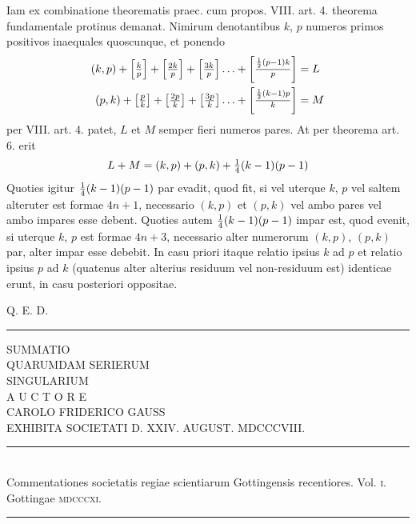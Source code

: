 \documentclass[twoside,12pt]{memoir}
\let\oldfrac\frac
\def\frac#1#2{\mathchoice{\tfrac{#1}{#2}}{\oldfrac{#1}{#2}}{\genfrac{}{}{}{2}{#1}{#2\mathstrut}}{\genfrac{}{}{}{3}{#1}{#2\mathstrut}}}
\begin{document}
Iam ex combinatione theorematis praec. cum propos. VIII. art. 4. theorema fundamentale protinus demanat. Nimirum denotantibus \(k\), \(p\) numeros primos positivos inaequales quoscunque, et ponendo
\[\begin{aligned}
(k, p)+\left[\frac{k}{p}\right]+\left[\frac{2 k}{p}\right]+\left[\frac{3 k}{p}\right] \ldots+\left[\frac{\frac{1}{2} (p-1) k}{p} \right] &=L\\
(p, k)+\left[\frac{p}{k}\right]+\left[\frac{2 p}{k}\right]+\left[\frac{3 p}{k}\right] \ldots+\left[\frac{\frac{1}{2} (k-1) p}{k}\right] &= M
\end{aligned}\]
per VIII. art. 4. patet, \(L\) et \(M\) semper fieri numeros pares. At per theorema art. 6. erit
\[L+M=(k, p)+(p, k)+\frac{1}{4}(k-1)(p-1)\]
Quoties igitur \(\frac{1}{4}(k-1)(p-1)\) par evadit, quod fit, si vel uterque \(k\), \(p\) vel saltem alteruter est formae \(4 n+1\), necessario \((k, p)\) et \((p, k)\) vel ambo pares vel ambo impares esse debent. Quoties autem \(\frac{1}{4}(k-1)(p-1)\) impar est, quod evenit, si uterque \(k\), \(p\) est formae \(4 n+3\), necessario alter numerorum \((k, p)\), \((p, k)\) par, alter impar esse debebit. In casu priori itaque relatio ipsius \(k\) ad \(p\) et relatio ipsius \(p\) ad \(k\) (quatenus alter alterius residuum vel non-residuum est) identicae erunt, in casu posteriori oppositae.
 
\qquad Q. E. D.\\[\baselineskip]
\begin{center}\rule{1.5in}{0.5pt}\end{center}
\pagebreak%

\begin{center}
{\large SUMMATIO }\\[2\baselineskip]
{\LARGE QUARUMDAM SERIERUM}\\[2\baselineskip]
{\Large SINGULARIUM}\\[4\baselineskip]
{\tiny A U C T O R E}\\[1.5\baselineskip]
{CAROLO FRIDERICO GAUSS}\\[1.5\baselineskip]
{\scriptsize EXHIBITA SOCIETATI D. XXIV. AUGUST. MDCCCVIII.}\\[4\baselineskip]
\rule{4in}{0.5pt}\\[0.5\baselineskip]
{\scriptsize Commentationes societatis regiae scientiarum Gottingensis recentiores. Vol. \textsc{i}.\\
Gottingae \textsc{mdcccxi}.}\\
\rule{4in}{0.5pt}
\end{center}
\pagebreak%
\;\pagebreak%
\end{document}
